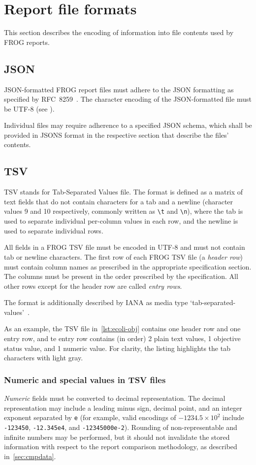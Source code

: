 \section{Report file formats}

This section describes the encoding of information into file contents used by FROG reports.

\subsection{JSON}
\label{sec:json}

JSON-formatted FROG report files must adhere to the JSON formatting as specified by RFC~8259~\cite{rfc8259}.
The character encoding of the JSON-formatted file must be UTF-8 (see \cite[][section 8.1]{rfc8259}).

Individual files may require adherence to a specified JSON schema, which shall be provided in JSONS format in the respective section that describe the files' contents.

\subsection{TSV}
\label{sec:tsv}

TSV stands for Tab-Separated Values file. The format is defined as a matrix of text fields that do not contain characters for a tab and a newline (character values 9 and 10 respectively, commonly written as \verb|\t| and \verb|\n|), where the tab is used to separate individual per-column values in each row, and the newline is used to separate individual rows.

All fields in a FROG TSV file must be encoded in UTF-8 and must not contain tab or newline characters. The first row of each FROG TSV file (a \emph{header row}) must contain column names as prescribed in the appropriate specification section. The columns must be present in the order prescribed by the specification. All other rows except for the header row are called \emph{entry rows}.

The format is additionally described by IANA as media type `tab-separated-values'~\cite{ianatsv}.

As an example, the TSV file in~\cref{lst:ecoli-obj} contains one header row and one entry row, and te entry row contains (in order) 2 plain text values, 1 objective status value, and 1 numeric value. For clarity, the listing highlights the tab characters with light gray.

\subsubsection{Numeric and special values in TSV files}
\emph{Numeric} fields must be converted to decimal representation. The decimal representation may include a leading minus sign, decimal point, and an integer exponent separated by \verb|e| (for example, valid encodings of $-1234.5\times10^2$ include \verb|-123450|, \verb|-12.345e4|, and \verb|-12345000e-2|). Rounding of non-representable and infinite numbers may be performed, but it should not invalidate the stored information with respect to the report comparison methodology, as described in~\cref{sec:cmpdata}.

